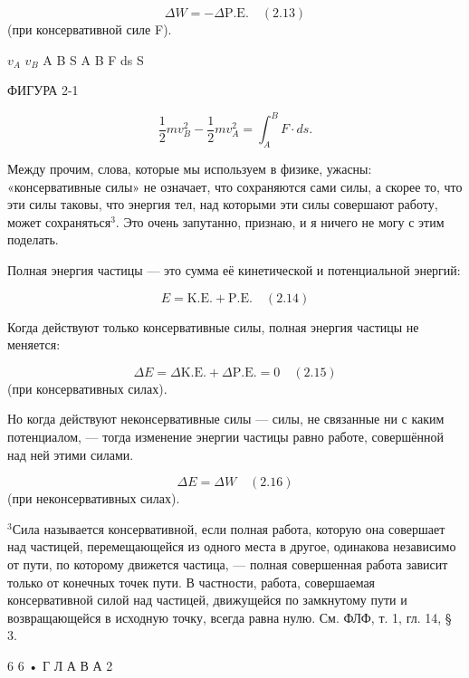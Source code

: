 \documentclass[10pt,oneside]{article}
\newcommand{\TipsRunning}[1]{\par\vspace{2bp}{\centering\footnotesize #1\par}\vspace{2bp}}
\begin{document}
\[\Delta W = -\Delta \text{P.E.} \quad(2.13)\] (при консервативной силе F).\par

\TipsRunning{З А К О Н Ы  И  И Н Т У И Ц И Я • 6 5}

\(v_A\) \(v_B\) A B S A B F ds S\par

ФИГУРА 2-1\par

\[\frac{1}{2}mv_B^2 - \frac{1}{2}mv_A^2 = \int_A^B F \cdot ds.\]\par

Между прочим, слова, которые мы используем в физике, ужасны: «консервативные силы» не означает, что сохраняются сами силы, а скорее то, что эти силы таковы, что энергия тел, над которыми эти силы совершают работу, может сохраняться\(^3\). Это очень запутанно, признаю, и я ничего не могу с этим поделать.\par

Полная энергия частицы --- это сумма её кинетической и потенциальной энергий:\par

\[E = \text{K.E.} + \text{P.E.}  \quad(2.14)\]\par

Когда действуют только консервативные силы, полная энергия частицы не меняется:\par

\[\Delta E = \Delta \text{K.E.} + \Delta \text{P.E.} = 0 \quad(2.15)\] (при консервативных силах).\par

Но когда действуют неконсервативные силы --- силы, не связанные ни с каким потенциалом, --- тогда изменение энергии частицы равно работе, совершённой над ней этими силами.\par

\[\Delta E = \Delta W \quad(2.16)\] (при неконсервативных силах).\par

\(^3\)Сила называется консервативной, если полная работа, которую она совершает над частицей, перемещающейся из одного места в другое, одинакова независимо от пути, по которому движется частица, --- полная совершенная работа зависит только от конечных точек пути. В частности, работа, совершаемая консервативной силой над частицей, движущейся по замкнутому пути и возвращающейся в исходную точку, всегда равна нулю. См. ФЛФ, т. 1, гл. 14, § 3.\par

6 6 • Г Л А В А  2\par
\end{document}

